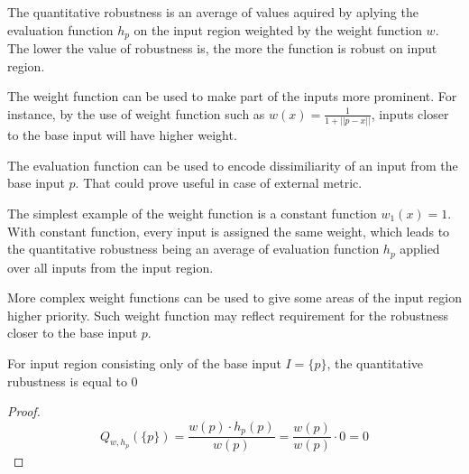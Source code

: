 The quantitative robustness is an average of values aquired by
aplying the evaluation function $h_p$ on the input region
weighted by the weight function $w$. The lower the value of robustness is,
the more the function is robust on input region.

The weight function can be used to make part of the inputs more prominent.
For instance, by the use of weight function such as $w(x) = \frac{1}{1+||p-x||}$,
inputs closer to the base input will have higher weight.

The evaluation function can be used to encode dissimiliarity of an input
from the base input $p$. That could prove useful in case of external metric.


The simplest example of the weight function is a constant function $w_1(x) = 1$.
With constant function, every input is assigned the same weight,
which leads to the quantitative robustness being an average
of evaluation function $h_p$ applied over all inputs from the input region.

More complex weight functions can be used to give some areas of the input region
higher priority. Such weight function may reflect requirement for the robustness
closer to the base input $p$.

\begin{lemma}{For input region consisting only of the base input $I=\{p\}$,
    the quantitative rubustness is equal to 0}
    \begin{proof}
        \begin{equation*}
            Q_{w, h_p}(\{p\}) = \frac{w(p)\cdot h_p(p)}{w(p)} = \frac{w(p)}{w(p)}\cdot 0 = 0
        \end{equation*}
    \end{proof}
\end{lemma}

